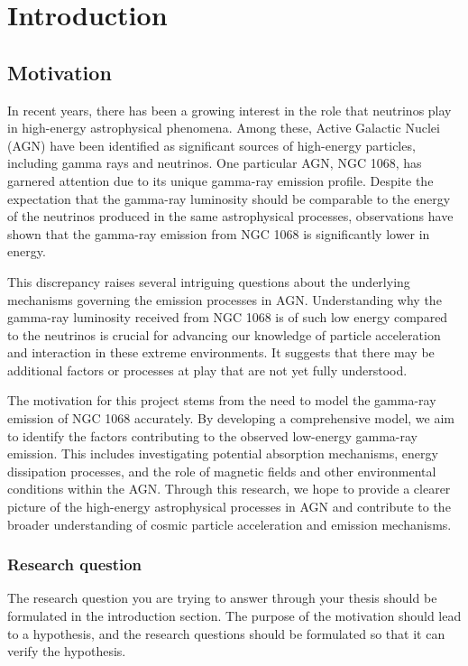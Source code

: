 \chapter{Introduction}
\label{chap:Introduction}

\section{Motivation}

In recent years, there has been a growing interest in the role that neutrinos play in high-energy astrophysical phenomena. Among these, Active Galactic Nuclei (AGN) have been identified as significant sources of high-energy particles, including gamma rays and neutrinos. One particular AGN, NGC 1068, has garnered attention due to its unique gamma-ray emission profile. Despite the expectation that the gamma-ray luminosity should be comparable to the energy of the neutrinos produced in the same astrophysical processes, observations have shown that the gamma-ray emission from NGC 1068 is significantly lower in energy.

This discrepancy raises several intriguing questions about the underlying mechanisms governing the emission processes in AGN. Understanding why the gamma-ray luminosity received from NGC 1068 is of such low energy compared to the neutrinos is crucial for advancing our knowledge of particle acceleration and interaction in these extreme environments. It suggests that there may be additional factors or processes at play that are not yet fully understood.

The motivation for this project stems from the need to model the gamma-ray emission of NGC 1068 accurately. By developing a comprehensive model, we aim to identify the factors contributing to the observed low-energy gamma-ray emission. This includes investigating potential absorption mechanisms, energy dissipation processes, and the role of magnetic fields and other environmental conditions within the AGN. Through this research, we hope to provide a clearer picture of the high-energy astrophysical processes in AGN and contribute to the broader understanding of cosmic particle acceleration and emission mechanisms.

\subsection{Research question}

The research question you are trying to answer through your thesis should be formulated in the introduction section. The purpose of the motivation should lead to a hypothesis, and the research questions should be formulated so that it can verify the hypothesis.

